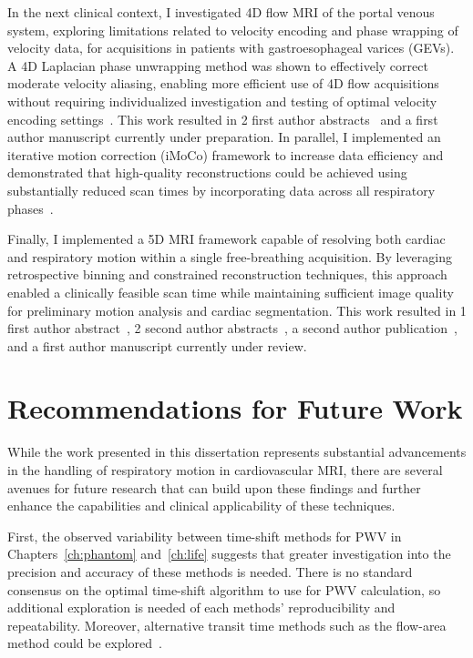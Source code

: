 In the next clinical context, I investigated 4D flow MRI of the portal venous system, exploring limitations related to velocity encoding and phase wrapping of velocity data, for acquisitions in patients with gastroesophageal varices (GEVs). A 4D Laplacian phase unwrapping method was shown to effectively correct moderate velocity aliasing, enabling more efficient use of 4D flow acquisitions without requiring individualized investigation and testing of optimal velocity encoding settings~\cite{loecherPhaseUnwrapping4D2016}. This work resulted in 2 first author abstracts~\cite{narenDualVenc, narenHowLow} and a first author manuscript currently under preparation. In parallel, I implemented an iterative motion correction (iMoCo) framework to increase data efficiency and demonstrated that high-quality reconstructions could be achieved using substantially reduced scan times by incorporating data across all respiratory phases~\cite{zhuIterativeMotioncompensationReconstruction2020}. 

Finally, I implemented a 5D MRI framework capable of resolving both cardiac and respiratory motion within a single free-breathing acquisition. By leveraging retrospective binning and constrained reconstruction techniques, this approach enabled a clinically feasible scan time while maintaining sufficient image quality for preliminary motion analysis and cardiac segmentation. This work resulted in 1 first author abstract~\cite{naren5DMRIFramework}, 2 second author abstracts~\cite{ruffDeducingRespiratoryCardiac2023, ruffDecoupling}, a second author publication~\cite{ruffDeducingCardiorespiratoryMotion2026}, and a first author manuscript currently under review. 

\section{Recommendations for Future Work}
While the work presented in this dissertation represents substantial advancements in the handling of respiratory motion in cardiovascular MRI\@, there are several avenues for future research that can build upon these findings and further enhance the capabilities and clinical applicability of these techniques.

First, the observed variability between time-shift methods for PWV in Chapters~\ref{ch:phantom} and~\ref{ch:life} suggests that greater investigation into the precision and accuracy of these methods is needed. There is no standard consensus on the optimal time-shift algorithm to use for PWV calculation, so additional exploration is needed of each methods' reproducibility and repeatability. Moreover, alternative transit time methods such as the flow-area method could be explored~\cite{vulliemozEstimationLocalAortic2002}.

